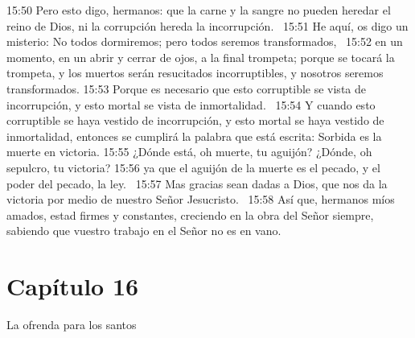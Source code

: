 15:50 Pero esto digo, hermanos: que la carne y la sangre no pueden heredar el reino de Dios, ni la corrupción hereda la incorrupción.  
15:51 He aquí, os digo un misterio: No todos dormiremos; pero todos seremos transformados,  
15:52 en un momento, en un abrir y cerrar de ojos, a la final trompeta; porque se tocará la trompeta, y los muertos serán resucitados incorruptibles, y nosotros seremos transformados. 
15:53 Porque es necesario que esto corruptible se vista de incorrupción, y esto mortal se vista de inmortalidad.  
15:54 Y cuando esto corruptible se haya vestido de incorrupción, y esto mortal se haya vestido de inmortalidad, entonces se cumplirá la palabra que está escrita: Sorbida es la muerte en victoria. 
15:55 ¿Dónde está, oh muerte, tu aguijón? ¿Dónde, oh sepulcro, tu victoria? 
15:56 ya que el aguijón de la muerte es el pecado, y el poder del pecado, la ley.  
15:57 Mas gracias sean dadas a Dios, que nos da la victoria por medio de nuestro Señor Jesucristo.  
15:58 Así que, hermanos míos amados, estad firmes y constantes, creciendo en la obra del Señor siempre, sabiendo que vuestro trabajo en el Señor no es en vano.  
\section*{Capítulo 16}
La ofrenda para los santos  

